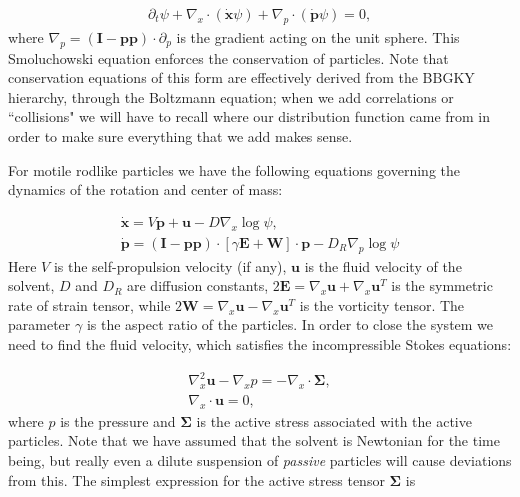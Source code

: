 \documentclass[onecolumn,showpacs,preprintnumbers,prl,amsmath,amssymb]{revtex4-1}
\def\b{\mathbf}
\begin{document}
\begin{gather}
\label{eq:Smoluchowski}
\partial_t\psi+\nabla_x\cdot(\b{\dot{x}}\psi)+\nabla_p\cdot(\b{\dot{p}}\psi)=0,
\end{gather}
where $\nabla_p=(\b{I}-\b{pp})\cdot\partial_p$ is the gradient acting on the unit sphere. This Smoluchowski equation enforces the conservation of particles. Note that conservation equations of this form are effectively derived from the BBGKY hierarchy, through the Boltzmann equation; when we add correlations or ``collisions"  we will have to recall where our distribution function came from in order to make sure everything that we add makes sense.

For motile rodlike particles we have the following equations governing the dynamics of the rotation and center of mass:

\begin{gather}
\b{\dot{x}}=V\b{p}+\b{u}-D\nabla_x\log\psi,\\
\b{\dot{p}}=(\b{I}-\b{pp})\cdot\left[\gamma\b{E}+\b{W}\right]\cdot\b{p}-D_R\nabla_p\log\psi
\end{gather}
Here $V$ is the self-propulsion velocity (if any), $\b{u}$ is the fluid velocity of the solvent, $D$ and $D_R$ are diffusion constants, $2\b{E}=\nabla_x\b{u}+\nabla_x\b{u}^T$ is the symmetric rate of strain tensor, while $2\b{W}=\nabla_x\b{u}-\nabla_x\b{u}^T$ is the vorticity tensor. The parameter $\gamma$ is the aspect ratio of the particles. In order to close the system we need to find the fluid velocity, which satisfies the incompressible Stokes equations:

\begin{gather}
\nabla_x^2\b{u}-\nabla_x p=-\nabla_x\cdot\b{\Sigma},\\
\nabla_x\cdot\b{u}=0,
\end{gather}
where $p$ is the pressure and $\b{\Sigma}$ is the active stress associated with the active particles. Note that we have assumed that the solvent is Newtonian for the time being, but really even a dilute suspension of {\it passive} particles will cause deviations from this. The simplest expression for the active stress tensor $\b{\Sigma}$ is 
\end{document}
